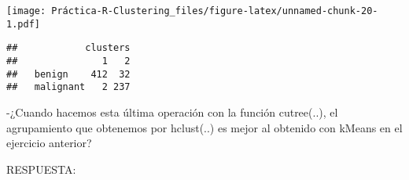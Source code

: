\documentclass[]{article}
\newenvironment{Shaded}{\begin{snugshade}}{\end{snugshade}}
\newcommand{\KeywordTok}[1]{\textcolor[rgb]{0.13,0.29,0.53}{\textbf{#1}}}
\newcommand{\NormalTok}[1]{#1}
\newcommand{\OperatorTok}[1]{\textcolor[rgb]{0.81,0.36,0.00}{\textbf{#1}}}
\begin{document}
\texttt{[image: Práctica-R-Clustering\_files/figure-latex/unnamed-chunk-20-1.pdf]}

\begin{Shaded}
\end{Shaded}

\begin{verbatim}
##            clusters
##               1   2
##   benign    412  32
##   malignant   2 237
\end{verbatim}

-¿Cuando hacemos esta última operación con la función cutree(..), el
agrupamiento que obtenemos por hclust(..) es mejor al obtenido con
kMeans en el ejercicio anterior?

RESPUESTA:
\end{document}
